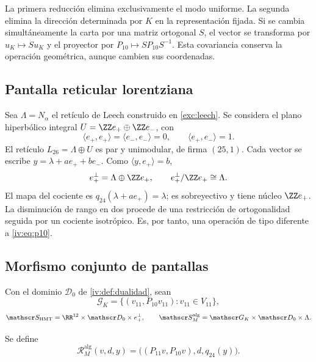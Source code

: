 La primera reducción elimina exclusivamente el modo uniforme.
La segunda elimina la dirección determinada por \(K\) en
la representación fijada. Si se cambia simultáneamente la carta
por una matriz ortogonal \(S\), el vector se transforma por
\(u_K\mapsto Su_K\) y el proyector por
\(P_{10}\mapsto SP_{10}S^{-1}\). Esta covariancia conserva
la operación geométrica, aunque cambien sus coordenadas.

\subsection{Pantalla reticular lorentziana}

Sea \(\Lambda=N_\alpha\) el retículo de Leech construido
en \ref{exc:leech}. Se considera el plano hiperbólico integral
\(U=\ZZ e_+\oplus\ZZ e_-\), con
\[
 \langle e_+,e_+\rangle=\langle e_-,e_-\rangle=0,
 \qquad\langle e_+,e_-\rangle=1.
\]
El retículo \(L_{26}=\Lambda\oplus U\) es par y
unimodular, de firma \((25,1)\). Cada vector se escribe
\(y=\lambda+ae_++be_-\). Como
\(\langle y,e_+\rangle=b\),
\begin{equation}
 e_+^\perp=\Lambda\oplus\ZZ e_+,
 \qquad e_+^\perp/\ZZ e_+\cong\Lambda.
 \label{iv:eq:26-24}
\end{equation}
El mapa del cociente es
\(q_{24}(\lambda+ae_+)=\lambda\); es sobreyectivo y tiene
núcleo \(\ZZ e_+\). La disminución de rango en dos procede
de una restricción de ortogonalidad seguida por un cociente
isotrópico. Es, por tanto, una operación de tipo diferente a
\eqref{iv:eq:p10}.

\subsection{Morfismo conjunto de pantallas}

Con el dominio \(\mathscr D_0\) de \ref{iv:def:dualidad},
sean
\[
 \mathscr G_K=\{(v_{11},P_{10}v_{11}):v_{11}\in V_{11}\},
\]
\[
 \mathscr S_{\mathrm{HMT}}=\RR^{12}\times\mathscr D_0\times e_+^\perp,
 \qquad
 \mathscr S_M^{\mathrm{alg}}=\mathscr G_K\times\mathscr D_0\times\Lambda.
\]
\begin{definition}
\label{iv:def:rm-alg}
Se define
\begin{equation}
 \mathcal R_M^{\mathrm{alg}}(v,d,y)
 =\bigl((P_{11}v,P_{10}v),d,q_{24}(y)\bigr).
 \label{iv:eq:rm-alg}
\end{equation}
\end{definition}

